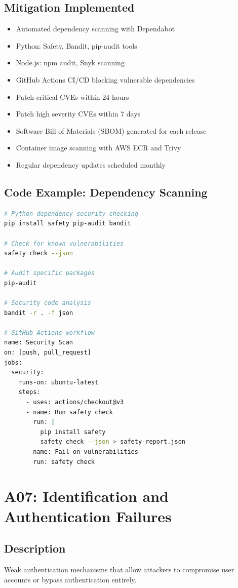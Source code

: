 \documentclass{report}
\begin{document}
\subsection{Mitigation Implemented}
\begin{itemize}
\item Automated dependency scanning with Dependabot
\item Python: Safety, Bandit, pip-audit tools
\item Node.js: npm audit, Snyk scanning
\item GitHub Actions CI/CD blocking vulnerable dependencies
\item Patch critical CVEs within 24 hours
\item Patch high severity CVEs within 7 days
\item Software Bill of Materials (SBOM) generated for each release
\item Container image scanning with AWS ECR and Trivy
\item Regular dependency updates scheduled monthly
\end{itemize}

\subsection{Code Example: Dependency Scanning}
\begin{lstlisting}[language=bash]
# Python dependency security checking
pip install safety pip-audit bandit

# Check for known vulnerabilities
safety check --json

# Audit specific packages
pip-audit

# Security code analysis
bandit -r . -f json

# GitHub Actions workflow
name: Security Scan
on: [push, pull_request]
jobs:
  security:
    runs-on: ubuntu-latest
    steps:
      - uses: actions/checkout@v3
      - name: Run safety check
        run: |
          pip install safety
          safety check --json > safety-report.json
      - name: Fail on vulnerabilities
        run: safety check
\end{lstlisting}

\section{A07: Identification and Authentication Failures}

\subsection{Description}
Weak authentication mechanisms that allow attackers to compromise user accounts or bypass authentication entirely.
\end{document}

